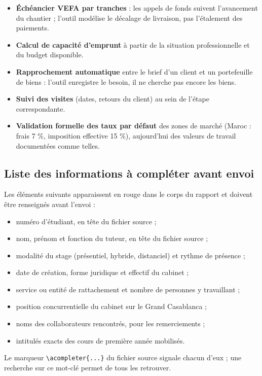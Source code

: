 \documentclass[12pt,a4paper]{article}
\begin{document}
\begin{itemize}
	\item \textbf{Échéancier VEFA par tranches} : les appels de fonds suivent
	l'avancement du chantier ; l'outil modélise le décalage de livraison, pas
	l'étalement des paiements.
	\item \textbf{Calcul de capacité d'emprunt} à partir de la situation
	professionnelle et du budget disponible.
	\item \textbf{Rapprochement automatique} entre le brief d'un client et un
	portefeuille de biens : l'outil enregistre le besoin, il ne cherche pas encore
	les biens.
	\item \textbf{Suivi des visites} (dates, retours du client) au sein de l'étape
	correspondante.
	\item \textbf{Validation formelle des taux par défaut} des zones de marché
	(Maroc : frais 7 \%, imposition effective 15 \%), aujourd'hui des valeurs de
	travail documentées comme telles.
\end{itemize}

\subsection{Liste des informations à compléter avant envoi}

\begin{encadre}
	Les éléments suivants apparaissent en rouge dans le corps du rapport et doivent
	être renseignés avant l'envoi :
	\begin{itemize}\itemsep0.15em
		\item numéro d'étudiant, en tête du fichier source ;
		\item nom, prénom et fonction du tuteur, en tête du fichier source ;
		\item modalité du stage (présentiel, hybride, distanciel) et rythme de
		présence ;
		\item date de création, forme juridique et effectif du cabinet ;
		\item service ou entité de rattachement et nombre de personnes y travaillant ;
		\item position concurrentielle du cabinet sur le Grand Casablanca ;
		\item noms des collaborateurs rencontrés, pour les remerciements ;
		\item intitulés exacts des cours de première année mobilisés.
	\end{itemize}
	Le marqueur \verb|\acompleter{...}| du fichier source signale chacun d'eux ;
	une recherche sur ce mot-clé permet de tous les retrouver.
\end{encadre}
\end{document}
